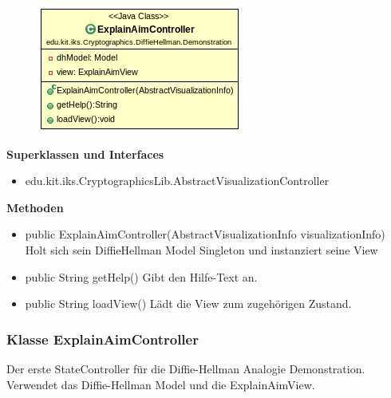 \documentclass{article}
\begin{document}
      \begin{figure}[H]
        \centering
        \includegraphics[width=\textwidth]{resources/edu-kit-iks-Cryptographics-DiffieHellman-Demonstration-ExplainAimController}
      \end{figure}

      \textbf{Superklassen und Interfaces}
      \begin{itemize}
        \item edu.kit.iks.CryptographicsLib.AbstractVisualizationController
      \end{itemize}

      \textbf{Methoden}
      \begin{itemize}
          \item public ExplainAimController(AbstractVisualizationInfo visualizationInfo) \newline
              Holt sich sein DiffieHellman Model Singleton und instanziert seine View
        \item public String getHelp() \newline
        Gibt den Hilfe-Text an.
        \item public String loadView() \newline
        Lädt die View zum zugehörigen Zustand.
      \end{itemize}
\subsubsection{Klasse ExplainAimController}
      Der erste StateController für die Diffie-Hellman Analogie Demonstration.
      Verwendet das Diffie-Hellman Model und die ExplainAimView.
\end{document}
